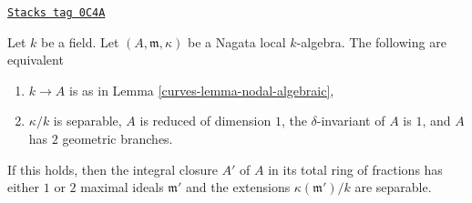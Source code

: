 \begin{lemma}
\label{curves-lemma-2-branches-delta-1}
\href{https://stacks.math.columbia.edu/tag/0C4A}{\texttt{Stacks tag 0C4A}}

Let $k$ be a field. Let $(A, \mathfrak m, \kappa)$ be a
Nagata local $k$-algebra. The following are equivalent
\begin{enumerate}
\item $k \to A$ is as in Lemma \ref{curves-lemma-nodal-algebraic},
\item $\kappa/k$ is separable, $A$ is reduced of dimension $1$,
the $\delta$-invariant of $A$ is $1$, and $A$ has $2$ geometric branches.
\end{enumerate}
If this holds, then the integral closure $A'$ of $A$
in its total ring of fractions has either $1$ or $2$
maximal ideals $\mathfrak m'$ and the extensions
$\kappa(\mathfrak m')/k$ are separable.
\end{lemma}

